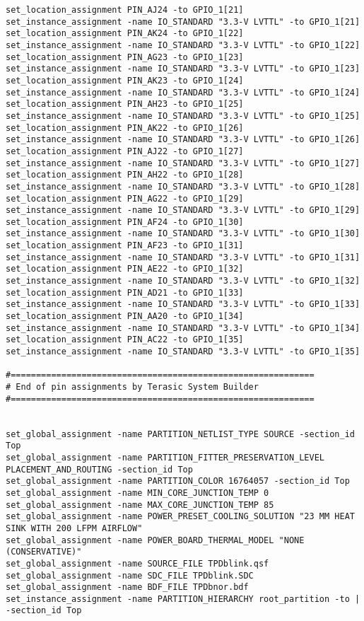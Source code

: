 \documentclass[dvipdfm]{book}
\begin{document}
\begin{verbatim}
set_location_assignment PIN_AJ24 -to GPIO_1[21]
set_instance_assignment -name IO_STANDARD "3.3-V LVTTL" -to GPIO_1[21]
set_location_assignment PIN_AK24 -to GPIO_1[22]
set_instance_assignment -name IO_STANDARD "3.3-V LVTTL" -to GPIO_1[22]
set_location_assignment PIN_AG23 -to GPIO_1[23]
set_instance_assignment -name IO_STANDARD "3.3-V LVTTL" -to GPIO_1[23]
set_location_assignment PIN_AK23 -to GPIO_1[24]
set_instance_assignment -name IO_STANDARD "3.3-V LVTTL" -to GPIO_1[24]
set_location_assignment PIN_AH23 -to GPIO_1[25]
set_instance_assignment -name IO_STANDARD "3.3-V LVTTL" -to GPIO_1[25]
set_location_assignment PIN_AK22 -to GPIO_1[26]
set_instance_assignment -name IO_STANDARD "3.3-V LVTTL" -to GPIO_1[26]
set_location_assignment PIN_AJ22 -to GPIO_1[27]
set_instance_assignment -name IO_STANDARD "3.3-V LVTTL" -to GPIO_1[27]
set_location_assignment PIN_AH22 -to GPIO_1[28]
set_instance_assignment -name IO_STANDARD "3.3-V LVTTL" -to GPIO_1[28]
set_location_assignment PIN_AG22 -to GPIO_1[29]
set_instance_assignment -name IO_STANDARD "3.3-V LVTTL" -to GPIO_1[29]
set_location_assignment PIN_AF24 -to GPIO_1[30]
set_instance_assignment -name IO_STANDARD "3.3-V LVTTL" -to GPIO_1[30]
set_location_assignment PIN_AF23 -to GPIO_1[31]
set_instance_assignment -name IO_STANDARD "3.3-V LVTTL" -to GPIO_1[31]
set_location_assignment PIN_AE22 -to GPIO_1[32]
set_instance_assignment -name IO_STANDARD "3.3-V LVTTL" -to GPIO_1[32]
set_location_assignment PIN_AD21 -to GPIO_1[33]
set_instance_assignment -name IO_STANDARD "3.3-V LVTTL" -to GPIO_1[33]
set_location_assignment PIN_AA20 -to GPIO_1[34]
set_instance_assignment -name IO_STANDARD "3.3-V LVTTL" -to GPIO_1[34]
set_location_assignment PIN_AC22 -to GPIO_1[35]
set_instance_assignment -name IO_STANDARD "3.3-V LVTTL" -to GPIO_1[35]

#============================================================
# End of pin assignments by Terasic System Builder
#============================================================


set_global_assignment -name PARTITION_NETLIST_TYPE SOURCE -section_id Top
set_global_assignment -name PARTITION_FITTER_PRESERVATION_LEVEL PLACEMENT_AND_ROUTING -section_id Top
set_global_assignment -name PARTITION_COLOR 16764057 -section_id Top
set_global_assignment -name MIN_CORE_JUNCTION_TEMP 0
set_global_assignment -name MAX_CORE_JUNCTION_TEMP 85
set_global_assignment -name POWER_PRESET_COOLING_SOLUTION "23 MM HEAT SINK WITH 200 LFPM AIRFLOW"
set_global_assignment -name POWER_BOARD_THERMAL_MODEL "NONE (CONSERVATIVE)"
set_global_assignment -name SOURCE_FILE TPDblink.qsf
set_global_assignment -name SDC_FILE TPDblink.SDC
set_global_assignment -name BDF_FILE TPDbnor.bdf
set_instance_assignment -name PARTITION_HIERARCHY root_partition -to | -section_id Top


\end{verbatim}
\end{document}
